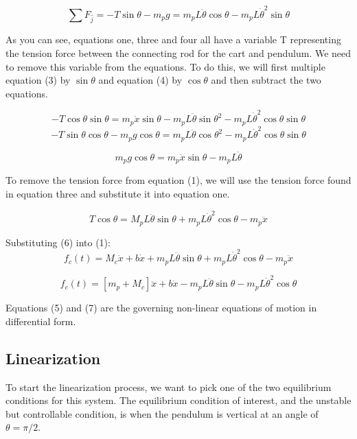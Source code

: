 \documentclass[titlepage]{article}
\begin{document}
\begin{equation}
\sum{}{F_{\hat{j}}} = -T\sin{\theta} - m_{p}g = m_{p}L\ddot{\theta}\cos{\theta} - m_{p}L\dot{\theta}^{2}\sin{\theta}
\end{equation}

As you can see, equations one, three and four all have a variable T representing the tension force between the connecting rod for the cart and pendulum. We need to remove this variable from the equations. To do this, we will first multiple equation (3) by \(\sin{\theta}\) and equation (4) by \(\cos{\theta}\) and then subtract the two equations.

\[-T\cos{\theta}\sin{\theta} = m_{p}\ddot{x}\sin{\theta} - m_{p}L\ddot{\theta}\sin{\theta}^2 - m_{p}L\dot{\theta}^{2}\cos{\theta}\sin{\theta}\]
\[-T\sin{\theta}\cos{\theta} - m_{p}g\cos{\theta} = m_{p}L\ddot{\theta}\cos{\theta}^2 - m_{p}L\dot{\theta}^{2}\cos{\theta}\sin{\theta}\]

\begin{equation}
m_{p}g\cos{\theta} = m_{p}\ddot{x}\sin{\theta} - m_{p}L\ddot{\theta}
\end{equation}

To remove the tension force from equation (1), we will use the tension force found in equation three and substitute it into equation one.

\begin{equation}
T\cos{\theta} = M_{p}L\ddot{\theta}\sin{\theta} + m_{p}L\dot{\theta}^{2}\cos{\theta} - m_{p}\ddot{x}
\end{equation}

Substituting (6) into (1):
\[ f_{c}\left(t\right) = M_{c}\ddot{x} + b\dot{x} +  m_{p}L\ddot{\theta}\sin{\theta} + m_{p}L\dot{\theta}^{2}\cos{\theta} - m_{p}\ddot{x}\]

\begin{equation}
f_{c}\left(t\right) = \left[m_{p} + M_{c}\right]\ddot{x} + b\dot{x} -  m_{p}L\ddot{\theta}\sin{\theta} - m_{p}L\dot{\theta}^{2}\cos{\theta}
\end{equation}

Equations (5) and (7) are the governing non-linear equations of motion in differential form.

\subsection{Linearization}

To start the linearization process, we want to pick one of the two equilibrium conditions for this system. The equilibrium condition of interest, and the unstable but controllable condition, is when the pendulum is vertical at an angle of \(\theta = \pi / 2\).
\end{document}
